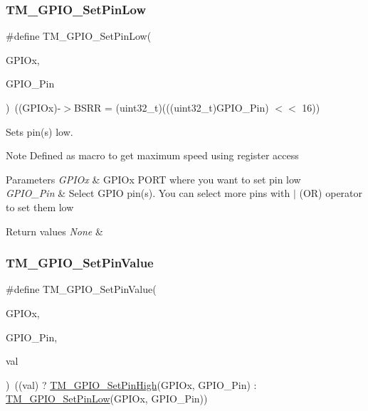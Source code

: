 \subsubsection{\texorpdfstring{T\+M\+\_\+\+G\+P\+I\+O\+\_\+\+Set\+Pin\+Low}{TM\_GPIO\_SetPinLow}}
{\footnotesize\ttfamily \#define T\+M\+\_\+\+G\+P\+I\+O\+\_\+\+Set\+Pin\+Low(\begin{DoxyParamCaption}\item[{}]{G\+P\+I\+Ox,  }\item[{}]{G\+P\+I\+O\+\_\+\+Pin }\end{DoxyParamCaption})~((G\+P\+I\+Ox)-\/$>$B\+S\+RR = (uint32\+\_\+t)(((uint32\+\_\+t)G\+P\+I\+O\+\_\+\+Pin) $<$$<$ 16))}



Sets pin(s) low. 

\begin{DoxyNote}{Note}
Defined as macro to get maximum speed using register access 
\end{DoxyNote}

\begin{DoxyParams}{Parameters}
{\em G\+P\+I\+Ox} & G\+P\+I\+Ox P\+O\+RT where you want to set pin low \\
\hline
{\em G\+P\+I\+O\+\_\+\+Pin} & Select G\+P\+IO pin(s). You can select more pins with $\vert$ (OR) operator to set them low \\
\hline
\end{DoxyParams}

\begin{DoxyRetVals}{Return values}
{\em None} & \\
\hline
\end{DoxyRetVals}
\mbox{\label{group___t_m___g_p_i_o___functions_gaf0bc34b72794ca43246ef88cfd261e80}} 
\subsubsection{\texorpdfstring{T\+M\+\_\+\+G\+P\+I\+O\+\_\+\+Set\+Pin\+Value}{TM\_GPIO\_SetPinValue}}
{\footnotesize\ttfamily \#define T\+M\+\_\+\+G\+P\+I\+O\+\_\+\+Set\+Pin\+Value(\begin{DoxyParamCaption}\item[{}]{G\+P\+I\+Ox,  }\item[{}]{G\+P\+I\+O\+\_\+\+Pin,  }\item[{}]{val }\end{DoxyParamCaption})~((val) ? \hyperlink{group___t_m___g_p_i_o___functions_gac5aa8fbc39ed67f47972097fb7c8d69d}{T\+M\+\_\+\+G\+P\+I\+O\+\_\+\+Set\+Pin\+High}(G\+P\+I\+Ox, G\+P\+I\+O\+\_\+\+Pin) \+: \hyperlink{group___t_m___g_p_i_o___functions_gaccceda87ce348c73b43780fdfed048d3}{T\+M\+\_\+\+G\+P\+I\+O\+\_\+\+Set\+Pin\+Low}(G\+P\+I\+Ox, G\+P\+I\+O\+\_\+\+Pin))}



